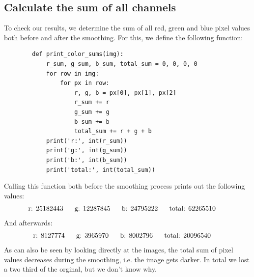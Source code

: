 \newpage
\subsection{Calculate the sum of all channels}
    To check our results, we determine the sum of all red, green 
    and blue pixel values both before and after the smoothing.
    For this, we define the following function:
    \begin{lstlisting}
        def print_color_sums(img):
            r_sum, g_sum, b_sum, total_sum = 0, 0, 0, 0
            for row in img:
                for px in row:
                    r, g, b = px[0], px[1], px[2]
                    r_sum += r
                    g_sum += g
                    b_sum += b
                    total_sum += r + g + b
            print('r:', int(r_sum))
            print('g:', int(g_sum))
            print('b:', int(b_sum))
            print('total:', int(total_sum))\end{lstlisting}
    Calling this function both before the smoothing process prints out
    the following values: \\
    $$
        \textnormal{r: 25182443} \ \ \ \ \
        \textnormal{g: 12287845} \ \ \ \ \
        \textnormal{b: 24795222} \ \ \ \ \
        \textnormal{total: 62265510} \ \ \ \ \
    $$
    And afterwards:
    $$
        \textnormal{r: 8127774} \ \ \ \ \
        \textnormal{g: 3965970} \ \ \ \ \
        \textnormal{b: 8002796} \ \ \ \ \
        \textnormal{total: 20096540} \ \ \ \ \
    $$
    As can also be seen by looking directly at the images, the total sum of 
    pixel values decreases during the smoothing, i.e. the image gets darker. In total we lost a two third of the orginal, but we don't know why.
